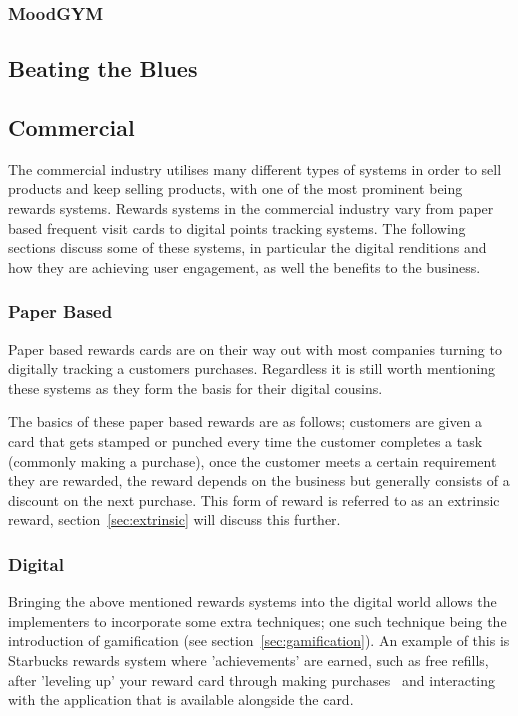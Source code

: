\documentclass[a4paper,12pt]{article}
\begin{document}
\subsubsection{MoodGYM}

\subsection{Beating the Blues}


\subsection{Commercial}
The commercial industry utilises many different types of systems in order to sell products and keep selling products, with one of the most prominent being rewards systems. Rewards systems in the commercial industry vary from paper based frequent visit cards to digital points tracking systems. The following sections discuss some of these systems, in particular the digital renditions and how they are achieving user engagement, as well the benefits to the business.

\subsubsection{Paper Based}
Paper based rewards cards are on their way out with most companies turning to digitally tracking a customers purchases. Regardless it is still worth mentioning these systems as they form the basis for their digital cousins.

\par
The basics of these paper based rewards are as follows; customers are given a card that gets stamped or punched every time the customer completes a task (commonly making a purchase), once the customer meets a certain requirement they are rewarded, the reward depends on the business but generally consists of a discount on the next purchase. This form of reward is referred to as an extrinsic reward, section~\ref{sec:extrinsic} will discuss this further.

\subsubsection{Digital}
Bringing the above mentioned rewards systems into the digital world allows the implementers to incorporate some extra techniques; one such technique being the introduction of gamification (see section~\ref{sec:gamification}). An example of this is Starbucks rewards system where 'achievements' are earned, such as free refills, after 'leveling up' your reward card through making purchases~\citep{gamifying-intelligent-environments} and interacting with the application that is available alongside the card.
\end{document}

